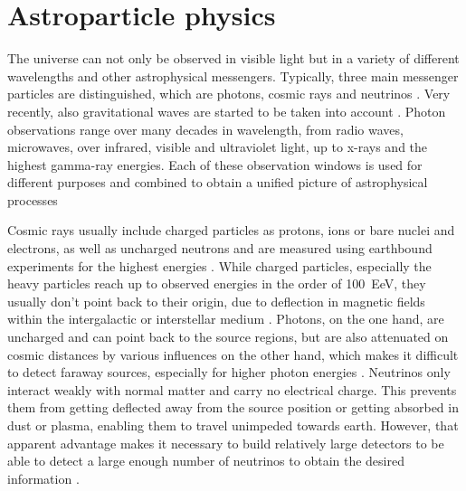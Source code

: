 \chapter{Astroparticle physics}
  \label{chap:astro}

The universe can not only be observed in visible light but in a variety of different wavelengths and other astrophysical messengers.
Typically, three main messenger particles are distinguished, which are photons, cosmic rays and neutrinos \cite{Cirkel-Bartelt2008,Giovanelli:2009,Learned:2000sw,Halzen:2016gng}.
Very recently, also gravitational waves are started to be taken into account \cite{Abbott:2016blz,TheLIGOScientific:2017qsa}.
Photon observations range over many decades in wavelength, from radio waves, microwaves, over infrared, visible and ultraviolet light, up to x-rays and the highest gamma-ray energies.
Each of these observation windows is used for different purposes and combined to obtain a unified picture of astrophysical processes \cite{Wootten:2009qb,Liu:2018wot,Adam:2015rua,Werner:2004zk,Dalal:2017lpy,Lallo:2012hubble,Sembach:1998gc,ODell:2010:xray,TheFermi-LAT:2017pvy,Tibolla:2012magic,Lauer:2015hawc}

Cosmic rays usually include charged particles as protons, ions or bare nuclei and electrons, as well as uncharged neutrons and are measured using earthbound experiments for the highest energies \cite{Horandel:2015tpa,Yoon:2017qjx,PierreAugerSurface,PierreAugerFluorescence}.
While charged particles, especially the heavy particles reach up to observed energies in the order of \SI{100}{\exa\eV}, they usually don't point back to their origin, due to deflection in magnetic fields within the intergalactic or interstellar medium \cite{MedinaTanco:1997rt}.
Photons, on the one hand, are uncharged and can point back to the source regions, but are also attenuated on cosmic distances by various influences on the other hand, which makes it difficult to detect faraway sources, especially for higher photon energies \cite{GilmoreGammaRayAtt}.
Neutrinos only interact weakly with normal matter and carry no electrical charge.
This prevents them from getting deflected away from the source position or getting absorbed in dust or plasma, enabling them to travel unimpeded towards earth.
However, that apparent advantage makes it necessary to build relatively large detectors to be able to detect a large enough number of neutrinos to obtain the desired information \cite{Katz:2011ke,Anchordoqui:2013dnh}.

